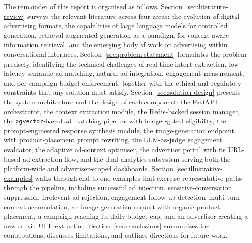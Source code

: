 The remainder of this report is organised as follows.
Section~\ref{sec:literature-review} surveys the relevant literature across four
areas: the evolution of digital advertising formats, the capabilities of large
language models for controlled generation, retrieval-augmented generation as a
paradigm for context-aware information retrieval, and the emerging body of work
on advertising within conversational interfaces. Section~\ref{sec:problem-statement}
formulates the problem precisely, identifying the technical challenges of
real-time intent extraction, low-latency semantic ad matching, natural ad
integration, engagement measurement, and per-campaign budget enforcement,
together with the ethical and regulatory constraints that any solution must
satisfy.
Section~\ref{sec:solution-design} presents the system architecture and the
design of each component: the FastAPI orchestrator, the context extraction
module, the Redis-backed session manager, the \texttt{pgvector}-based ad
matching pipeline with budget-gated eligibility, the prompt-engineered
response synthesis module, the image-generation endpoint with
product-placement prompt rewriting, the LLM-as-judge engagement evaluator,
the adaptive ad-context optimiser, the advertiser portal with its
URL-based ad extraction flow, and the dual analytics subsystem serving both
the platform-wide and advertiser-scoped dashboards. 
Section~\ref{sec:illustrative-examples} walks through end-to-end examples
that exercise representative paths through the pipeline, including successful
ad injection, sensitive-conversation suppression, irrelevant-ad rejection,
engagement follow-up detection, multi-turn context accumulation, an
image-generation request with organic product placement, a campaign reaching
its daily budget cap, and an advertiser creating a new ad via URL extraction.
Section~\ref{sec:conclusions} summarises the contributions, discusses
limitations, and outlines directions for future work.